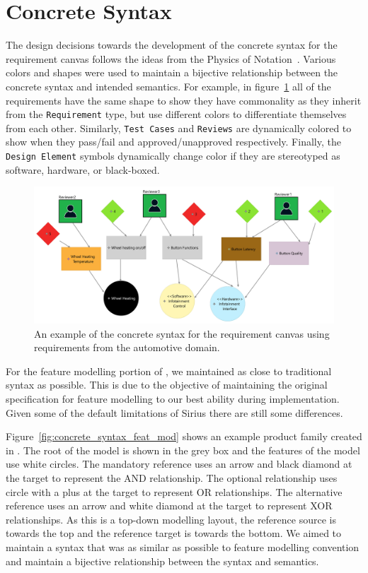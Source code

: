 \section{Concrete Syntax}
\label{sec:Concrete_Syntax}

The design decisions towards the development of the concrete syntax for the requirement canvas follows the ideas from the Physics of Notation~\cite{5353439}. Various colors and shapes were used to maintain a bijective relationship between the concrete syntax and intended semantics. For example, in figure~\ref{fig:concrete_syntax_req_diag} all of the requirements have the same shape to show they have commonality as they inherit from the \texttt{Requirement} type, but use different colors to differentiate themselves from each other. Similarly, \texttt{Test Cases} and \texttt{Reviews} are dynamically colored to show when they pass/fail and approved/unapproved respectively. Finally, the \texttt{Design Element} symbols dynamically change color if they are stereotyped as software, hardware, or black-boxed.

\begin{figure}[hbt!]
	\centering
	\includegraphics[scale=0.043]{Figures/Requirement Diagram_SteeringWheel.jpg}
	\caption{An example of the concrete syntax for the requirement canvas using requirements from the automotive domain.}
	\label{fig:concrete_syntax_req_diag}
\end{figure}

For the feature modelling portion of \tool, we maintained as close to traditional syntax as possible. This is due to the objective of maintaining the original specification for feature modelling to our best ability during implementation. Given some of the default limitations of Sirius there are still some differences. 

Figure~\ref{fig:concrete_syntax_feat_mod} shows an example product family created in \tool. The root of the model is shown in the grey box and the features of the model use white circles. The mandatory reference uses an arrow and black diamond at the target to represent the AND relationship. The optional relationship uses circle with a plus at the target to represent OR relationships. The alternative reference uses an arrow and white diamond at the target to represent XOR relationships. As this is a top-down modelling layout, the reference source is towards the top and the reference target is towards the bottom. We aimed to maintain a syntax that was as similar as possible to feature modelling convention and maintain a bijective relationship between the syntax and semantics.


